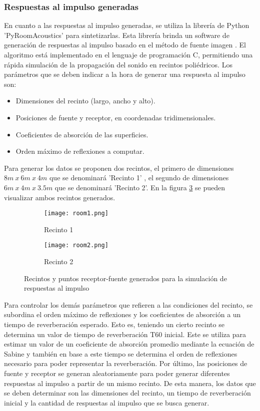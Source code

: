 \subsubsection{Respuestas al impulso generadas}

En cuanto a las respuestas al impulso generadas, se utiliza la librería de Python 'PyRoomAcoustics' \cite{pyroom} para sintetizarlas. Esta librería brinda un software de generación de respuestas al impulso basado en el método de fuente imagen  \cite{ISM}. El algoritmo está implementado en el lenguaje de programación C, permitiendo una rápida simulación de la propagación del sonido en recintos poliédricos. Los parámetros que se deben indicar a la hora de generar una respuesta al impulso son: 

\begin{itemize}
\item Dimensiones del recinto (largo, ancho y alto).
\item Posiciones de fuente y receptor, en coordenadas tridimensionales.
\item Coeficientes de absorción de las superficies.
\item Orden máximo de reflexiones a computar.
\end{itemize} 

Para generar los datos se proponen dos recintos, el primero de dimensiones $8m\: x\: 6m\: x\: 4m$ que se denominará 'Recinto 1' , el segundo de dimensiones $6m\: x\: 4m\: x\: 3.5m$ que se denominará 'Recinto 2'. En la figura \ref{fig:recintos} se pueden visualizar ambos recintos generados. 

\begin{figure}[H]
\centering
\begin{subfigure}{.5\textwidth}
  \centering
  \texttt{[image: room1.png]}
  \caption{Recinto 1}
  \label{fig:sub1}
\end{subfigure}%
\begin{subfigure}{.5\textwidth}
  \centering
  \texttt{[image: room2.png]}
  \caption{Recinto 2}
  \label{fig:sub2}
\end{subfigure}
\caption{Recintos y puntos receptor-fuente generados para la simulación de respuestas al impulso}
\label{fig:recintos}
\end{figure}

Para controlar los demás parámetros que refieren a las condiciones del recinto, se subordina el orden máximo de reflexiones y los coeficientes de absorción a un tiempo de reverberación esperado. Esto es, teniendo un cierto recinto se determina un valor de tiempo de reverberación T60 inicial. Este se utiliza para estimar un valor de un coeficiente de absorción promedio mediante la ecuación de Sabine y también en base a este tiempo se determina el orden de reflexiones necesario para poder representar la reverberación. 
Por último, las posiciones de fuente y receptor se generan aleatoriamente para poder generar diferentes respuestas al impulso a partir de un mismo recinto. De esta manera, los datos que se deben determinar son las dimensiones del recinto, un tiempo de reverberación inicial y la cantidad de respuestas al impulso que se busca generar. 

